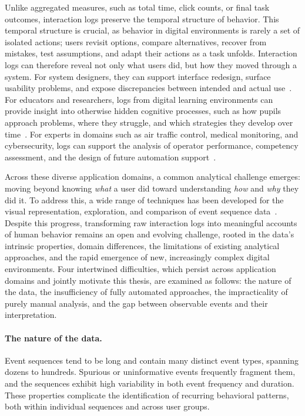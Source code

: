 Unlike aggregated measures, such as total time, click counts, or final task outcomes, interaction logs preserve the temporal structure of behavior.
This temporal structure is crucial, as behavior in digital environments is rarely a set of isolated actions; users revisit options, compare alternatives, recover from mistakes, test assumptions, and adapt their actions as a task unfolds.
Interaction logs can therefore reveal not only what users did, but how they moved through a system.
For system designers, they can support interface redesign, surface usability problems, and expose discrepancies between intended and actual use~\cite{blascheck2019exploration, xu2020survey}.
For educators and researchers, logs from digital learning environments can provide insight into otherwise hidden cognitive processes, such as how pupils approach problems, where they struggle, and which strategies they develop over time~\cite{coffrin2014visualizing, chen2020viseq}.
For experts in domains such as air traffic control, medical monitoring, and cybersecurity, logs can support the analysis of operator performance, competency assessment, and the design of future automation support~\cite{nguyen2020vasabi, goodwin2022veta, liebers2023viscomet}.

Across these diverse application domains, a common analytical challenge emerges: moving beyond knowing \textit{what} a user did toward understanding \textit{how} and \textit{why} they did it.
To address this, a wide range of techniques has been developed for the visual representation, exploration, and comparison of event sequence data~\cite{guo2022survey, linden2023survey}.
Despite this progress, transforming raw interaction logs into meaningful accounts of human behavior remains an open and evolving challenge, rooted in the data's intrinsic properties, domain differences, the limitations of existing analytical approaches, and the rapid emergence of new, increasingly complex digital environments.
Four intertwined difficulties, which persist across application domains and jointly motivate this thesis, are examined as follows: the nature of the data, the insufficiency of fully automated approaches, the impracticality of purely manual analysis, and the gap between observable events and their interpretation.

\paragraph{The nature of the data.}
Event sequences tend to be long and contain many distinct event types, spanning dozens to hundreds.
Spurious or uninformative events frequently fragment them, and the sequences exhibit high variability in both event frequency and duration.
These properties complicate the identification of recurring behavioral patterns, both within individual sequences and across user groups.

